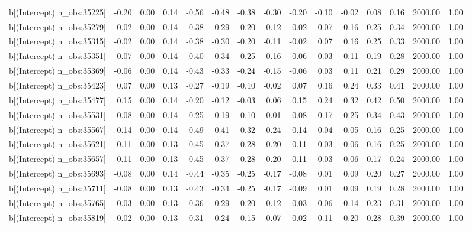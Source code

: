 \begin{table}[ht]
\begin{tabular}{rrrrrrrrrrrrrrr}
  b[(Intercept) n\_obs:35225] & -0.20 & 0.00 & 0.14 & -0.56 & -0.48 & -0.38 & -0.30 & -0.20 & -0.10 & -0.02 & 0.08 & 0.16 & 2000.00 & 1.00 \\ 
  b[(Intercept) n\_obs:35279] & -0.02 & 0.00 & 0.14 & -0.38 & -0.29 & -0.20 & -0.12 & -0.02 & 0.07 & 0.16 & 0.25 & 0.34 & 2000.00 & 1.00 \\ 
  b[(Intercept) n\_obs:35315] & -0.02 & 0.00 & 0.14 & -0.38 & -0.30 & -0.20 & -0.11 & -0.02 & 0.07 & 0.16 & 0.25 & 0.33 & 2000.00 & 1.00 \\ 
  b[(Intercept) n\_obs:35351] & -0.07 & 0.00 & 0.14 & -0.40 & -0.34 & -0.25 & -0.16 & -0.06 & 0.03 & 0.11 & 0.19 & 0.28 & 2000.00 & 1.00 \\ 
  b[(Intercept) n\_obs:35369] & -0.06 & 0.00 & 0.14 & -0.43 & -0.33 & -0.24 & -0.15 & -0.06 & 0.03 & 0.11 & 0.21 & 0.29 & 2000.00 & 1.00 \\ 
  b[(Intercept) n\_obs:35423] & 0.07 & 0.00 & 0.13 & -0.27 & -0.19 & -0.10 & -0.02 & 0.07 & 0.16 & 0.24 & 0.33 & 0.41 & 2000.00 & 1.00 \\ 
  b[(Intercept) n\_obs:35477] & 0.15 & 0.00 & 0.14 & -0.20 & -0.12 & -0.03 & 0.06 & 0.15 & 0.24 & 0.32 & 0.42 & 0.50 & 2000.00 & 1.00 \\ 
  b[(Intercept) n\_obs:35531] & 0.08 & 0.00 & 0.14 & -0.25 & -0.19 & -0.10 & -0.01 & 0.08 & 0.17 & 0.25 & 0.34 & 0.43 & 2000.00 & 1.00 \\ 
  b[(Intercept) n\_obs:35567] & -0.14 & 0.00 & 0.14 & -0.49 & -0.41 & -0.32 & -0.24 & -0.14 & -0.04 & 0.05 & 0.16 & 0.25 & 2000.00 & 1.00 \\ 
  b[(Intercept) n\_obs:35621] & -0.11 & 0.00 & 0.13 & -0.45 & -0.37 & -0.28 & -0.20 & -0.11 & -0.03 & 0.06 & 0.16 & 0.25 & 2000.00 & 1.00 \\ 
  b[(Intercept) n\_obs:35657] & -0.11 & 0.00 & 0.13 & -0.45 & -0.37 & -0.28 & -0.20 & -0.11 & -0.03 & 0.06 & 0.17 & 0.24 & 2000.00 & 1.00 \\ 
  b[(Intercept) n\_obs:35693] & -0.08 & 0.00 & 0.14 & -0.44 & -0.35 & -0.25 & -0.17 & -0.08 & 0.01 & 0.09 & 0.20 & 0.27 & 2000.00 & 1.00 \\ 
  b[(Intercept) n\_obs:35711] & -0.08 & 0.00 & 0.13 & -0.43 & -0.34 & -0.25 & -0.17 & -0.09 & 0.01 & 0.09 & 0.19 & 0.28 & 2000.00 & 1.00 \\ 
  b[(Intercept) n\_obs:35765] & -0.03 & 0.00 & 0.13 & -0.36 & -0.29 & -0.20 & -0.12 & -0.03 & 0.06 & 0.14 & 0.23 & 0.31 & 2000.00 & 1.00 \\ 
  b[(Intercept) n\_obs:35819] & 0.02 & 0.00 & 0.13 & -0.31 & -0.24 & -0.15 & -0.07 & 0.02 & 0.11 & 0.20 & 0.28 & 0.39 & 2000.00 & 1.00 \\ 

\end{tabular}
\end{table}
